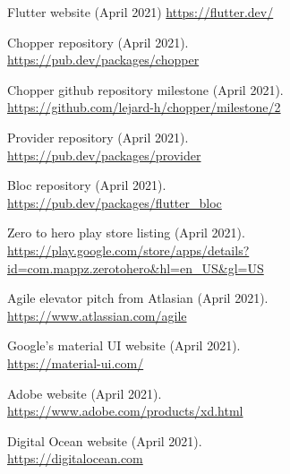 \documentclass{article}
\begin{document}
\begin{multicols}{2}
\begin{thebibliography}{9}
  Flutter website (April 2021)
  \url{https://flutter.dev/}

  Chopper repository (April 2021).\\
  \url{https://pub.dev/packages/chopper}

  Chopper github repository milestone (April 2021).\\
  \url{https://github.com/lejard-h/chopper/milestone/2}

  Provider repository (April 2021).\\
  \url{https://pub.dev/packages/provider}

  Bloc repository (April 2021).\\
  \url{https://pub.dev/packages/flutter\_bloc}

  Zero to hero play store listing (April 2021).\\
  \url{https://play.google.com/store/apps/details?id=com.mappz.zerotohero&hl=en\_US&gl=US}

  Agile elevator pitch from Atlasian (April 2021).\\
  \url{https://www.atlassian.com/agile}

  Google's material UI website (April 2021).\\
  \url{https://material-ui.com/}
  
  Adobe website (April 2021).\\
  \url{https://www.adobe.com/products/xd.html}

  Digital Ocean website (April 2021).\\
  \url{https://digitalocean.com}
\end{thebibliography}
\newpage
\end{multicols}
\end{document}
